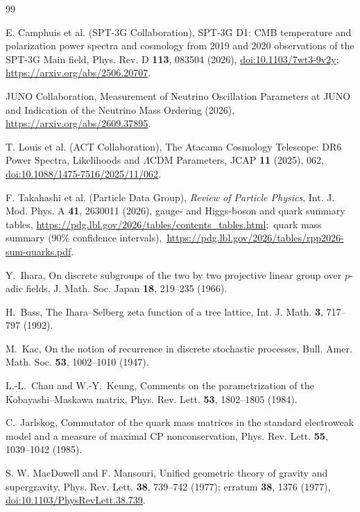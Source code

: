 \documentclass[aps,prx,onecolumn,10pt,notitlepage,nofootinbib,longbibliography]{revtex4-2}
\numberwithin{equation}{section}
\numberwithin{table}{section}
\begin{document}
\newpage
\begin{thebibliography}{99}\raggedright
\setlength{\itemsep}{2pt}

E. Camphuis et al. (SPT-3G Collaboration),
SPT-3G D1: CMB temperature and polarization power spectra and cosmology from
2019 and 2020 observations of the SPT-3G Main field,
Phys. Rev. D \textbf{113}, 083504 (2026),
\href{https://doi.org/10.1103/7wt3-9v2y}{doi:10.1103/7wt3-9v2y};
\url{https://arxiv.org/abs/2506.20707}.

JUNO Collaboration, Measurement of Neutrino Oscillation Parameters at JUNO
and Indication of the Neutrino Mass Ordering (2026),
\url{https://arxiv.org/abs/2609.37895}.

T. Louis et al. (ACT Collaboration), The Atacama Cosmology Telescope:
DR6 Power Spectra, Likelihoods and $\Lambda$CDM Parameters,
JCAP \textbf{11} (2025), 062,
\href{https://doi.org/10.1088/1475-7516/2025/11/062}{doi:10.1088/1475-7516/2025/11/062}.

F. Takahashi et al. (Particle Data Group), \emph{Review of Particle Physics},
Int. J. Mod. Phys. A \textbf{41}, 2630011 (2026),
gauge- and Higgs-boson and quark summary tables,
\url{https://pdg.lbl.gov/2026/tables/contents_tables.html};\
quark mass summary (90\% confidence intervals),\
\url{https://pdg.lbl.gov/2026/tables/rpp2026-sum-quarks.pdf}.

Y.~Ihara, On discrete subgroups of the two by two projective linear group over $p$-adic fields,
J. Math. Soc. Japan \textbf{18}, 219--235 (1966).

H.~Bass, The Ihara--Selberg zeta function of a tree lattice,
Int. J. Math. \textbf{3}, 717--797 (1992).

M.~Kac, On the notion of recurrence in discrete stochastic processes,
Bull. Amer. Math. Soc. \textbf{53}, 1002--1010 (1947).

L.-L.~Chau and W.-Y.~Keung, Comments on the parametrization of the Kobayashi--Maskawa matrix,
Phys. Rev. Lett. \textbf{53}, 1802--1805 (1984).

C.~Jarlskog, Commutator of the quark mass matrices in the standard electroweak model and a measure of maximal CP nonconservation,
Phys. Rev. Lett. \textbf{55}, 1039--1042 (1985).

S. W. MacDowell and F. Mansouri, Unified geometric theory of gravity and supergravity,
Phys. Rev. Lett. \textbf{38}, 739--742 (1977);
erratum \textbf{38}, 1376 (1977),
\href{https://doi.org/10.1103/PhysRevLett.38.739}{doi:10.1103/PhysRevLett.38.739}.


\end{thebibliography}
\end{document}
